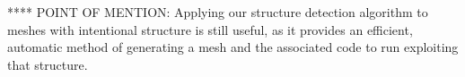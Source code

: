 













**** POINT OF MENTION:
Applying our structure detection algorithm to meshes with intentional structure is still useful, as it provides an efficient, automatic method of generating a mesh and the associated code to run exploiting that structure.